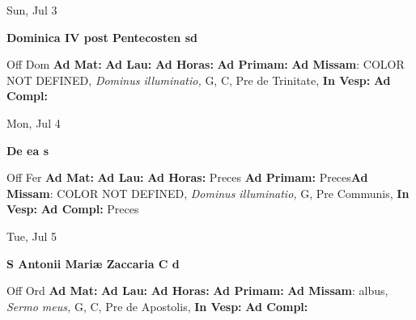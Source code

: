 \documentclass[10pt]{memoir}
\begin{document}
\begin{center}
\begin{minipage}{3.5in}
\vspace{2em}
\begin{center}Sun, Jul 3
\end{center}
\textbf{ \large Dominica IV post Pentecosten
\textnormal{\normalsize sd}}

\begin{justify}Off Dom
\textbf{Ad Mat: }
\textbf{Ad Lau: }
\textbf{Ad Horas: }
\textbf{Ad Primam: }\textbf{Ad Missam}: COLOR NOT DEFINED, \textit{Dominus illuminatio,} G, C, Pre de Trinitate, 
\textbf{In Vesp: }
\textbf{Ad Compl: }
\end{justify}
\end{minipage}
\end{center}

\begin{center}
\begin{minipage}{3.5in}
\vspace{2em}
\begin{center}Mon, Jul 4
\end{center}
\textbf{ \large De ea
\textnormal{\normalsize s}}

\begin{justify}Off Fer
\textbf{Ad Mat: }
\textbf{Ad Lau: }
\textbf{Ad Horas: }Preces
\textbf{Ad Primam: }Preces\textbf{Ad Missam}: COLOR NOT DEFINED, \textit{Dominus illuminatio,} G, Pre Communis, 
\textbf{In Vesp: }
\textbf{Ad Compl: }Preces
\end{justify}
\end{minipage}
\end{center}

\begin{center}
\begin{minipage}{3.5in}
\vspace{2em}
\begin{center}Tue, Jul 5
\end{center}
\textbf{ \large S Antonii Mariæ Zaccaria C
\textnormal{\normalsize d}}

\begin{justify}Off Ord
\textbf{Ad Mat: }
\textbf{Ad Lau: }
\textbf{Ad Horas: }
\textbf{Ad Primam: }\textbf{Ad Missam}: albus, \textit{Sermo meus,} G, C, Pre de Apostolis, 
\textbf{In Vesp: }
\textbf{Ad Compl: }
\end{justify}
\end{minipage}
\end{center}
\end{document}
